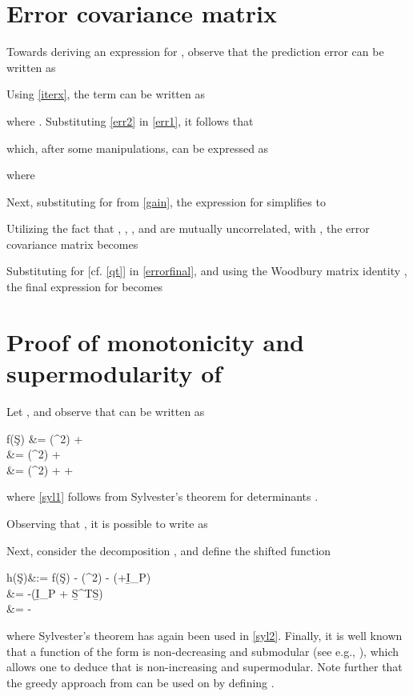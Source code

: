 \documentclass[draftcls,onecolumn,12pt]{IEEEtran}
\def \S {{\c{S}}}
\theoremstyle{plain}\newtheorem{thm}{Theorem}
\theoremstyle{definition}
\theoremstyle{remark}
\begin{document}
\appendices

\section{Error covariance matrix}\label{Aerr}
Towards deriving an expression for , observe that the prediction error can be written as 

Using \eqref{iterx}, the term  can be written as

where . Substituting \eqref{err2} in \eqref{err1}, it follows that

which, after some manipulations, can be expressed as
 
where 

Next, substituting for  from \eqref{gain}, the expression for   simplifies to

Utilizing the fact that , , , and  are mutually uncorrelated, with , the error covariance matrix  becomes

Substituting for  [cf. \eqref{qt}] in \eqref{errorfinal}, and using the Woodbury matrix identity \cite{golub}, the final expression for  becomes


\section{Proof of monotonicity and supermodularity of }\label{Asub}
Let , and observe that  can be written as

f(\S) &= \log(\sigma^2) + \log\det{} \\
&= \log(\sigma^2) + \log \det {} \label{syl1}\\
&= \log(\sigma^2) + \log \det {} + \log\det{}\label{fs}

where \eqref{syl1} follows from Sylvester's theorem for determinants \cite{golub}. 

Observing that , it is possible to write  as

Next, consider the decomposition , and define the shifted function

h(\S)&:= f(\S) - \log(\sigma^2) - \log\det\left(\bs{\Phi}+\b{I}_P\right) \\
&= -\log\det(\b{I}_P + \b{S}^T\b{S}\bs{\Phi}) \\
&= -\log\det\left[ \b{I}_S + (\b{S}\b{U})(\b{S}\b{U})^T \right] \label{syl2}

where Sylvester's theorem has again been used in \eqref{syl2}. 
Finally, it is well known that a function of the form  is non-decreasing and submodular (see e.g., \cite{bach}), which allows one to deduce that  is non-increasing and supermodular. Note further that the greedy approach from \cite{nemh} can be used on  by defining . 


\newpage



\end{document}
